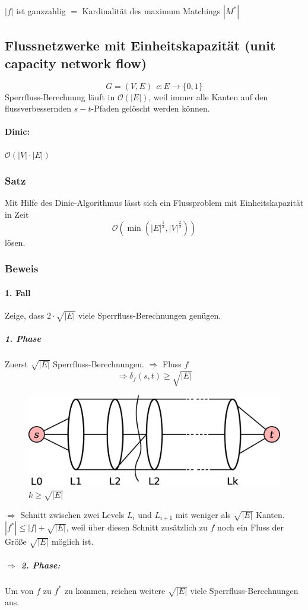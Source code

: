 $|f|$ ist ganzzahlig $=$ Kardinalität des maximum Matchings $|M^*|$
\subsection[Flussnetzwerke mit Einheitskapazität]{Flussnetzwerke mit Einheitskapazität (unit capacity network flow)}
\[ G=(V,E)~~c:E\rightarrow\{0,1\} \]
Sperrfluss-Berechnung läuft in $\mathcal{O}(|E|)$, weil immer alle Kanten auf den flussverbessernden $s-t$-Pfaden gelöscht werden können.
\paragraph{Dinic:} $\mathcal{O}(|V|\cdot|E|)$
\subsubsection{Satz}
Mit Hilfe des Dinic-Algorithmus lässt sich ein Flussproblem mit Einheitskapazität in Zeit 
\[ \mathcal{O}\left( \min\left( |E|^\frac{1}{2},|V|^\frac{2}{3} \right) \right) \]
lösen.
\subsubsection{Beweis}
\paragraph{1. Fall}
Zeige, dass $2\cdot\sqrt{|E|}$ viele Sperrfluss-Berechnungen genügen.
\subparagraph{1. Phase} Zuerst $\sqrt{|E|}$ Sperrfluss-Berechnungen. $\Rightarrow$ Fluss $f$ 
\[ \Rightarrow\delta_f(s,t)\geq \sqrt{|E|} \]
\begin{figure}[h]
	\centering
	\includegraphics[width=0.7\linewidth]{27/Grafik/Diagramm6}
	\caption{$k\geq \sqrt{|E|}$}
	\label{fig:Diagramm6}
\end{figure}
$\Rightarrow$ Schnitt zwischen zwei Levels $L_i$ und $L_{i+1}$ mit weniger als $\sqrt{|E|}$ Kanten.\\
$|f^*| \leq |f| +\sqrt{|E|}$, weil über diesen Schnitt zusätzlich zu $f$ noch ein Fluss der Größe $\sqrt{|E|}$ möglich ist.\\
\subparagraph{$\Rightarrow$ 2. Phase:}
Um von $f$ zu $f^*$ zu kommen, reichen weitere $\sqrt{|E|}$ viele Sperrfluss-Berechnungen aus.